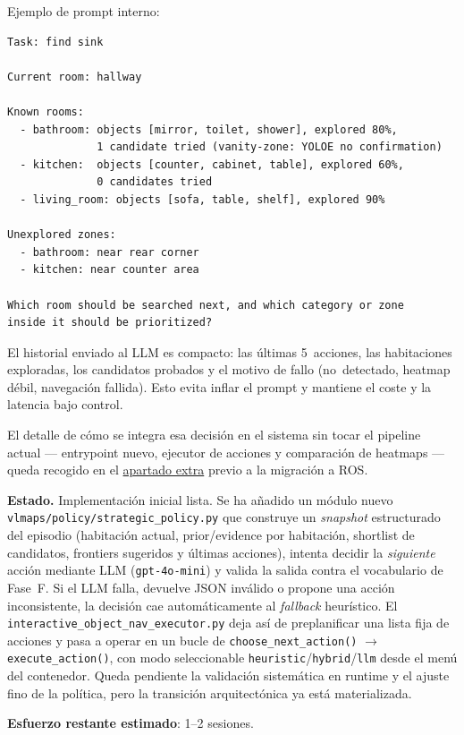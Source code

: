 \documentclass[11pt,a4paper]{article}
\begin{document}
Ejemplo de prompt interno:

\begin{verbatim}
Task: find sink

Current room: hallway

Known rooms:
  - bathroom: objects [mirror, toilet, shower], explored 80%,
              1 candidate tried (vanity-zone: YOLOE no confirmation)
  - kitchen:  objects [counter, cabinet, table], explored 60%,
              0 candidates tried
  - living_room: objects [sofa, table, shelf], explored 90%

Unexplored zones:
  - bathroom: near rear corner
  - kitchen: near counter area

Which room should be searched next, and which category or zone
inside it should be prioritized?
\end{verbatim}

El historial enviado al LLM es compacto: las últimas 5~acciones, las
habitaciones exploradas, los candidatos probados y el motivo de fallo
(no~detectado, heatmap débil, navegación fallida). Esto evita inflar el
prompt y mantiene el coste y la latencia bajo control.

El detalle de cómo se integra esa decisión en el sistema sin tocar el
pipeline actual --- entrypoint nuevo, ejecutor de acciones y comparación
de heatmaps --- queda recogido en el
\hyperref[sec:apartado-extra]{apartado extra} previo a la migración a ROS.

\textbf{Estado.} \textcolor{partialcol}{Implementación inicial lista}. Se ha
añadido un módulo nuevo \texttt{vlmaps/policy/strategic\_policy.py} que
construye un \emph{snapshot} estructurado del episodio (habitación actual,
prior/evidence por habitación, shortlist de candidatos, frontiers sugeridos y
últimas acciones), intenta decidir la \emph{siguiente} acción mediante LLM
(\texttt{gpt-4o-mini}) y valida la salida contra el vocabulario de Fase~F. Si
el LLM falla, devuelve JSON inválido o propone una acción inconsistente, la
decisión cae automáticamente al \emph{fallback} heurístico. El
\texttt{interactive\_object\_nav\_executor.py} deja así de preplanificar una
lista fija de acciones y pasa a operar en un bucle de
\texttt{choose\_next\_action()} $\rightarrow$ \texttt{execute\_action()}, con
modo seleccionable \texttt{heuristic}/\texttt{hybrid}/\texttt{llm} desde el
menú del contenedor. Queda pendiente la validación sistemática en runtime y el
ajuste fino de la política, pero la transición arquitectónica ya está
materializada.

\textbf{Esfuerzo restante estimado}: 1--2 sesiones.
\end{document}
